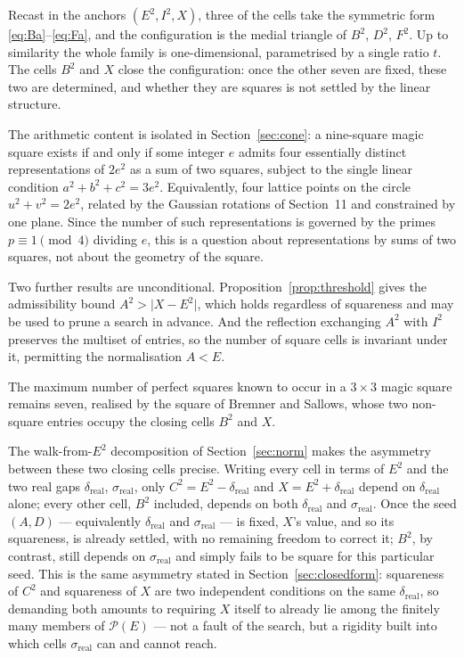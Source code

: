 \documentclass[12pt]{article}
\theoremstyle{remark}
\begin{document}
Recast in the anchors $(E^2, I^2, X)$, three of the cells take the
symmetric form \eqref{eq:Ba}--\eqref{eq:Fa}, and the configuration is
the medial triangle of $B^2$, $D^2$, $F^2$. Up to similarity the whole
family is one-dimensional, parametrised by a single ratio $t$. The
cells $B^2$ and $X$ close the configuration: once the other seven are
fixed, these two are determined, and whether they are squares is not
settled by the linear structure.

The arithmetic content is isolated in
Section~\ref{sec:cone}: a nine-square magic square exists if and only
if some integer $e$ admits four essentially distinct representations of
$2e^2$ as a sum of two squares, subject to the single linear condition
$a^2 + b^2 + c^2 = 3e^2$. Equivalently, four lattice points on the
circle $u^2 + v^2 = 2e^2$, related by the Gaussian rotations of
Section~11 and constrained by one plane. Since the number of such
representations is governed by the primes $p \equiv 1 \pmod 4$ dividing
$e$, this is a question about representations by sums of two squares,
not about the geometry of the square.

Two further results are unconditional.
Proposition~\ref{prop:threshold} gives the admissibility bound
$A^2 > \lvert X - E^2\rvert$, which holds regardless of squareness and
may be used to prune a search in advance. And the reflection exchanging
$A^2$ with $I^2$ preserves the multiset of entries, so the number of
square cells is invariant under it, permitting the normalisation
$A < E$.

The maximum number of perfect squares known to occur in a $3 \times 3$
magic square remains seven, realised by the square of Bremner and
Sallows, whose two non-square entries occupy the closing cells $B^2$
and $X$.

The walk-from-$E^2$ decomposition of Section~\ref{sec:norm} makes the
asymmetry between these two closing cells precise. Writing every cell
in terms of $E^2$ and the two real gaps $\delta_{\text{real}}$,
$\sigma_{\text{real}}$, only $C^2=E^2-\delta_{\text{real}}$ and
$X=E^2+\delta_{\text{real}}$ depend on $\delta_{\text{real}}$ alone;
every other cell, $B^2$ included, depends on both
$\delta_{\text{real}}$ and $\sigma_{\text{real}}$. Once the seed
$(A,D)$ --- equivalently $\delta_{\text{real}}$ and
$\sigma_{\text{real}}$ --- is fixed, $X$'s value, and so its
squareness, is already settled, with no remaining freedom to correct
it; $B^2$, by contrast, still depends on $\sigma_{\text{real}}$ and
simply fails to be square for this particular seed. This is the same
asymmetry stated in Section~\ref{sec:closedform}: squareness of $C^2$
and squareness of $X$ are two independent conditions on the same
$\delta_{\text{real}}$, so demanding both amounts to requiring $X$
itself to already lie among the finitely many members of $\mathcal
P(E)$ --- not a fault of the search, but a rigidity built into which
cells $\sigma_{\text{real}}$ can and cannot reach.
\end{document}
